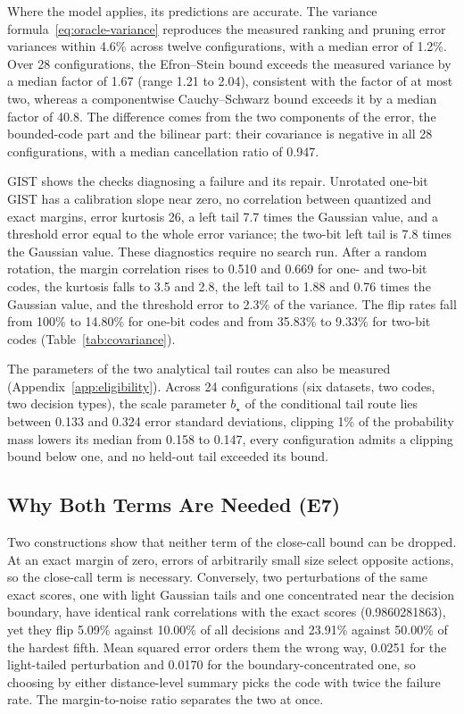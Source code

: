 \documentclass[twoside,11pt]{article}
\begin{document}
Where the model applies, its predictions are accurate. The variance formula~\eqref{eq:oracle-variance} reproduces the measured ranking and pruning error variances within 4.6\% across twelve configurations, with a median error of 1.2\%. Over 28 configurations, the Efron--Stein bound exceeds the measured variance by a median factor of 1.67 (range 1.21 to 2.04), consistent with the factor of at most two, whereas a componentwise Cauchy--Schwarz bound exceeds it by a median factor of 40.8. The difference comes from the two components of the error, the bounded-code part and the bilinear part: their covariance is negative in all 28 configurations, with a median cancellation ratio of 0.947.

GIST shows the checks diagnosing a failure and its repair. Unrotated one-bit GIST has a calibration slope near zero, no correlation between quantized and exact margins, error kurtosis 26, a left tail 7.7 times the Gaussian value, and a threshold error equal to the whole error variance; the two-bit left tail is 7.8 times the Gaussian value. These diagnostics require no search run. After a random rotation, the margin correlation rises to 0.510 and 0.669 for one- and two-bit codes, the kurtosis falls to 3.5 and 2.8, the left tail to 1.88 and 0.76 times the Gaussian value, and the threshold error to 2.3\% of the variance. The flip rates fall from 100\% to 14.80\% for one-bit codes and from 35.83\% to 9.33\% for two-bit codes (Table~\ref{tab:covariance}).

The parameters of the two analytical tail routes can also be measured (Appendix~\ref{app:eligibility}). Across 24 configurations (six datasets, two codes, two decision types), the scale parameter $b_\star$ of the conditional tail route lies between 0.133 and 0.324 error standard deviations, clipping 1\% of the probability mass lowers its median from 0.158 to 0.147, every configuration admits a clipping bound below one, and no held-out tail exceeded its bound.

\subsection{Why Both Terms Are Needed (E7)}
\label{sec:exp-necessity}

Two constructions show that neither term of the close-call bound can be dropped. At an exact margin of zero, errors of arbitrarily small size select opposite actions, so the close-call term is necessary. Conversely, two perturbations of the same exact scores, one with light Gaussian tails and one concentrated near the decision boundary, have identical rank correlations with the exact scores (0.9860281863), yet they flip 5.09\% against 10.00\% of all decisions and 23.91\% against 50.00\% of the hardest fifth. Mean squared error orders them the wrong way, 0.0251 for the light-tailed perturbation and 0.0170 for the boundary-concentrated one, so choosing by either distance-level summary picks the code with twice the failure rate. The margin-to-noise ratio separates the two at once.
\end{document}
